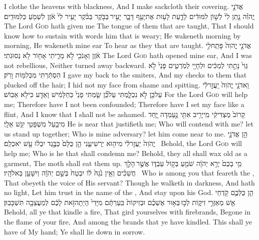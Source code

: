 {I clothe the heavens with blackness, And I make sackcloth their covering.}
{אֲדֹנָ֣י יֱהֹוִ֗ה נָ֤תַן לִי֙ לְשׁ֣וֹן לִמּוּדִ֔ים לָדַ֛עַת לָע֥וּת אֶת\maqqaf יָעֵ֖ף דָּבָ֑ר יָעִ֣יר \legarmeh  בַּבֹּ֣קֶר בַּבֹּ֗קֶר יָעִ֥יר לִי֙ אֹ֔זֶן לִשְׁמֹ֖עַ כַּלִּמּוּדִֽים׃}
{The Lord \textsc{God} hath given me The tongue of them that are taught, That I should know how to sustain with words him that is weary; He wakeneth morning by morning, He wakeneth mine ear To hear as they that are taught.}
{אֲדֹנָ֤י יֱהֹוִה֙ פָּתַֽח\maqqaf לִ֣י אֹ֔זֶן וְאָנֹכִ֖י לֹ֣א מָרִ֑יתִי אָח֖וֹר לֹ֥א נְסוּגֹֽתִי׃}
{The Lord \textsc{God} hath opened mine ear, And I was not rebellious, Neither turned away backward.}
{גֵּוִי֙ נָתַ֣תִּי לְמַכִּ֔ים וּלְחָיַ֖י לְמֹֽרְטִ֑ים פָּנַי֙ לֹ֣א הִסְתַּ֔רְתִּי מִכְּלִמּ֖וֹת וָרֹֽק׃}
{I gave my back to the smiters, And my checks to them that plucked off the hair; I hid not my face from shame and spitting.}
{וַֽאדֹנָ֤י יֱהֹוִה֙ יַֽעֲזׇר\maqqaf לִ֔י עַל\maqqaf כֵּ֖ן לֹ֣א נִכְלָ֑מְתִּי עַל\maqqaf כֵּ֞ן שַׂ֤מְתִּי פָנַי֙ כַּחַלָּמִ֔ישׁ וָאֵדַ֖ע כִּי\maqqaf לֹ֥א אֵבֽוֹשׁ׃}
{For the Lord \textsc{God} will help me; Therefore have I not been confounded; Therefore have I set my face like a flint, And I know that I shall not be ashamed.}
{קָרוֹב֙ מַצְדִּיקִ֔י מִֽי\maqqaf יָרִ֥יב אִתִּ֖י נַ֣עַמְדָה יָּ֑חַד מִי\maqqaf בַ֥עַל מִשְׁפָּטִ֖י יִגַּ֥שׁ אֵלָֽי׃}
{He is near that justifieth me; Who will contend with me? let us stand up together; Who is mine adversary? let him come near to me.}
{הֵ֣ן אֲדֹנָ֤י יֱהֹוִה֙ יַעֲזׇר\maqqaf לִ֔י מִי\maqqaf ה֖וּא יַרְשִׁיעֵ֑נִי הֵ֤ן כֻּלָּם֙ כַּבֶּ֣גֶד יִבְל֔וּ עָ֖שׁ יֹאכְלֵֽם׃ \setuma }
{Behold, the Lord \textsc{God} will help me; Who is he that shall condemn me? Behold, they all shall wax old as a garment, The moth shall eat them up.}
{מִ֤י בָכֶם֙ יְרֵ֣א יְהֹוָ֔ה שֹׁמֵ֖עַ בְּק֣וֹל עַבְדּ֑וֹ אֲשֶׁ֣ר \legarmeh  הָלַ֣ךְ חֲשֵׁכִ֗ים וְאֵ֥ין נֹ֙גַהּ֙ ל֔וֹ יִבְטַח֙ בְּשֵׁ֣ם יְהֹוָ֔ה וְיִשָּׁעֵ֖ן בֵּאלֹהָֽיו׃ \setuma }
{Who is among you that feareth the \lord, That obeyeth the voice of His servant? Though he walketh in darkness, And hath no light, Let him trust in the name of the \lord, And stay upon his God.}
{הֵ֧ן כֻּלְּכֶ֛ם קֹ֥דְחֵי אֵ֖שׁ מְאַזְּרֵ֣י זִיק֑וֹת לְכ֣וּ \legarmeh  בְּא֣וּר אֶשְׁכֶ֗ם וּבְזִיקוֹת֙ בִּֽעַרְתֶּ֔ם מִיָּדִי֙ הָיְתָה\maqqaf זֹּ֣את לָכֶ֔ם לְמַעֲצֵבָ֖ה תִּשְׁכָּבֽוּן׃ \setuma }
{Behold, all ye that kindle a fire, That gird yourselves with firebrands, Begone in the flame of your fire, And among the brands that ye have kindled. This shall ye have of My hand; Ye shall lie down in sorrow.}
